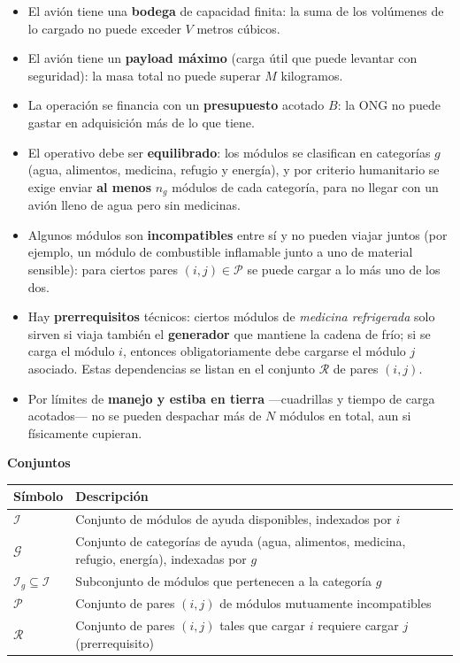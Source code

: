 \documentclass[11pt]{article}
\begin{document}
\begin{itemize}[leftmargin=1.4em]
    \item El avión tiene una \textbf{bodega} de capacidad finita: la suma de los volúmenes de lo cargado no puede exceder $V$ metros cúbicos.
    \item El avión tiene un \textbf{payload máximo} (carga útil que puede levantar con seguridad): la masa total no puede superar $M$ kilogramos.
    \item La operación se financia con un \textbf{presupuesto} acotado $B$: la ONG no puede gastar en adquisición más de lo que tiene.
    \item El operativo debe ser \textbf{equilibrado}: los módulos se clasifican en categorías $g$ (agua, alimentos, medicina, refugio y energía), y por criterio humanitario se exige enviar \textbf{al menos} $n_g$ módulos de cada categoría, para no llegar con un avión lleno de agua pero sin medicinas.
    \item Algunos módulos son \textbf{incompatibles} entre sí y no pueden viajar juntos (por ejemplo, un módulo de combustible inflamable junto a uno de material sensible): para ciertos pares $(i,j)\in\mathcal{P}$ se puede cargar a lo más uno de los dos.
    \item Hay \textbf{prerrequisitos} técnicos: ciertos módulos de \emph{medicina refrigerada} solo sirven si viaja también el \textbf{generador} que mantiene la cadena de frío; si se carga el módulo $i$, entonces obligatoriamente debe cargarse el módulo $j$ asociado. Estas dependencias se listan en el conjunto $\mathcal{R}$ de pares $(i,j)$.
    \item Por límites de \textbf{manejo y estiba en tierra} —cuadrillas y tiempo de carga acotados— no se pueden despachar más de $N$ módulos en total, aun si físicamente cupieran.
\end{itemize}

\bigskip
\noindent\textbf{Conjuntos}

\begin{tabular}{@{}ll@{}}
\toprule
Símbolo & Descripción \\
\midrule
$\mathcal{I}$ & Conjunto de módulos de ayuda disponibles, indexados por $i$ \\
$\mathcal{G}$ & Conjunto de categorías de ayuda (agua, alimentos, medicina, refugio, energía), indexadas por $g$ \\
$\mathcal{I}_g \subseteq \mathcal{I}$ & Subconjunto de módulos que pertenecen a la categoría $g$ \\
$\mathcal{P}$ & Conjunto de pares $(i,j)$ de módulos mutuamente incompatibles \\
$\mathcal{R}$ & Conjunto de pares $(i,j)$ tales que cargar $i$ requiere cargar $j$ (prerrequisito) \\
\bottomrule
\end{tabular}
\end{document}
